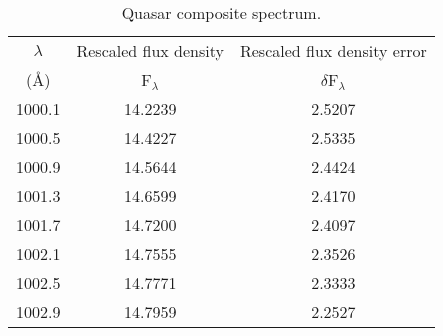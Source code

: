 \begin{table}
\centering
\begin{center}
\caption{Quasar composite spectrum.}
\begin{tabular}{ccc}
\hline
\hline
\noalign{\smallskip}
$\lambda$ &  Rescaled flux density & Rescaled flux density error \\  
({\AA}) & F$_{\lambda}$ & $\delta$F$_{\lambda}$ \\
\hline



1000.1 & 14.2239 & 2.5207 \\
1000.5 & 14.4227 & 2.5335 \\
1000.9 & 14.5644 & 2.4424 \\
1001.3 & 14.6599 & 2.4170 \\
1001.7 & 14.7200 & 2.4097 \\
1002.1 & 14.7555 & 2.3526 \\
1002.5 & 14.7771 & 2.3333 \\
1002.9 & 14.7959 & 2.2527 \\




\hline
\hline
\end{tabular}
\end{center}


\end{table}



